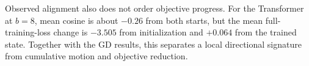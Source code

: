 Observed alignment also does not order objective progress. For the
Transformer at $b=8$, mean cosine is about $-0.26$ from both starts,
but the mean full-training-loss change is $-3.505$ from initialization
and $+0.064$ from the trained state. Together with the GD results,
this separates a local directional signature from cumulative motion
and objective reduction.
